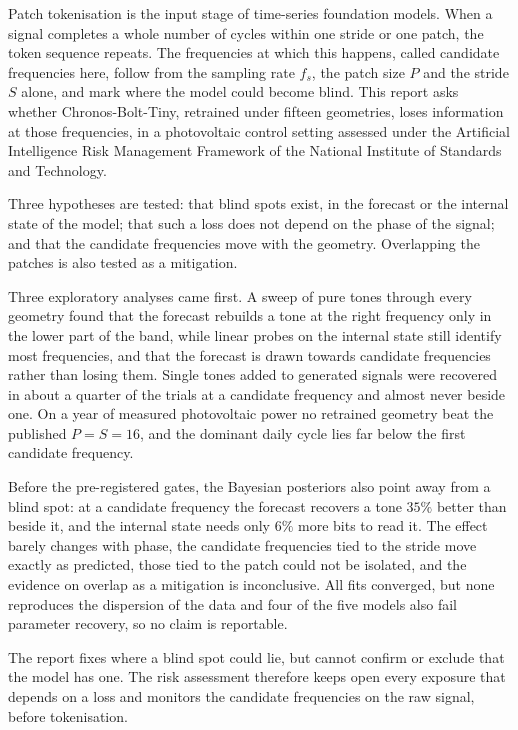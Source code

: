 \noindent Patch tokenisation is the input stage of time-series foundation models. When a signal completes a whole number of cycles within one stride or one patch, the token sequence repeats. The frequencies at which this happens, called candidate frequencies here, follow from the sampling rate $f_s$, the patch size $P$ and the stride $S$ alone, and mark where the model could become blind. This report asks whether Chronos-Bolt-Tiny, retrained under fifteen geometries, loses information at those frequencies, in a photovoltaic control setting assessed under the Artificial Intelligence Risk Management Framework of the National Institute of Standards and Technology.

\noindent Three hypotheses are tested: that blind spots exist, in the forecast or the internal state of the model; that such a loss does not depend on the phase of the signal; and that the candidate frequencies move with the geometry. Overlapping the patches is also tested as a mitigation.

\noindent Three exploratory analyses came first. A sweep of pure tones through every geometry found that the forecast rebuilds a tone at the right frequency only in the lower part of the band, while linear probes on the internal state still identify most frequencies, and that the forecast is drawn towards candidate frequencies rather than losing them. Single tones added to generated signals were recovered in about a quarter of the trials at a candidate frequency and almost never beside one. On a year of measured photovoltaic power no retrained geometry beat the published $P=S=16$, and the dominant daily cycle lies far below the first candidate frequency.

\noindent Before the pre-registered gates, the Bayesian posteriors also point away from a blind spot: at a candidate frequency the forecast recovers a tone $35\%$ better than beside it, and the internal state needs only $6\%$ more bits to read it. The effect barely changes with phase, the candidate frequencies tied to the stride move exactly as predicted, those tied to the patch could not be isolated, and the evidence on overlap as a mitigation is inconclusive. All fits converged, but none reproduces the dispersion of the data and four of the five models also fail parameter recovery, so no claim is reportable.

\noindent The report fixes where a blind spot could lie, but cannot confirm or exclude that the model has one. The risk assessment therefore keeps open every exposure that depends on a loss and monitors the candidate frequencies on the raw signal, before tokenisation.

